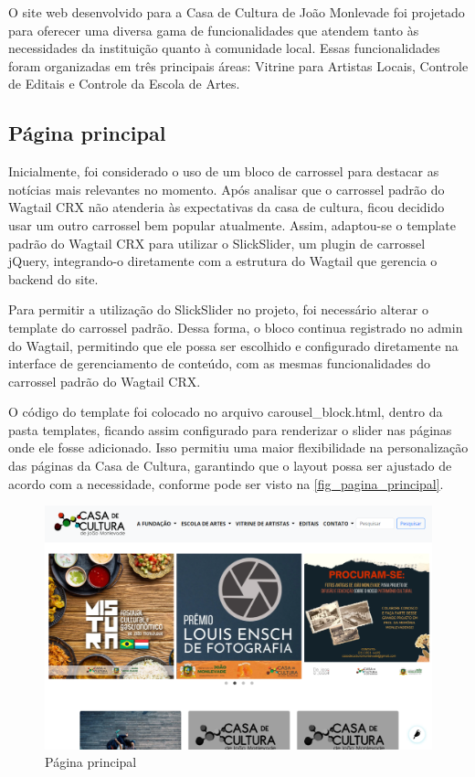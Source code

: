 O site web desenvolvido para a Casa de Cultura de João Monlevade foi projetado para oferecer uma diversa gama de funcionalidades que atendem tanto às necessidades da instituição quanto à comunidade local. Essas funcionalidades foram organizadas em três principais áreas: Vitrine para Artistas Locais, Controle de Editais e Controle da Escola de Artes.

\subsection{Página principal}

Inicialmente, foi considerado o uso de um bloco de carrossel para destacar as notícias mais relevantes no momento. Após analisar que o carrossel padrão do Wagtail CRX não atenderia às expectativas da casa de cultura, ficou decidido usar um outro carrossel bem popular atualmente. Assim, adaptou-se o template padrão do Wagtail CRX para utilizar o SlickSlider, um plugin de carrossel jQuery, integrando-o diretamente com a estrutura do Wagtail que gerencia o backend do site.

Para permitir a utilização do SlickSlider no projeto, foi necessário alterar o template do carrossel padrão. Dessa forma, o bloco continua registrado no admin do Wagtail, permitindo que ele possa ser escolhido e configurado diretamente na interface de gerenciamento de conteúdo, com as mesmas funcionalidades do carrossel padrão do Wagtail CRX.

O código do template foi colocado no arquivo carousel\_block.html, dentro da pasta templates, ficando assim configurado para renderizar o slider nas páginas onde ele fosse adicionado. Isso permitiu uma maior flexibilidade na personalização das páginas da Casa de Cultura, garantindo que o layout possa ser ajustado de acordo com a necessidade, conforme pode ser visto na \autoref{fig_pagina_principal}.

\begin{figure}[htb]
	\caption{\label{fig_pagina_principal}Página principal}
	\begin{center}
	    \includegraphics[scale=0.35]{./img/pagina_principal.png}
	\end{center}
\end{figure}


